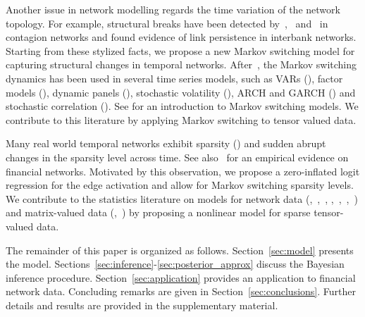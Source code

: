 \documentclass[12pt,a4paper]{article}
\theoremstyle{custom}
\begin{document}
Another issue in network modelling regards the time variation of the network topology.
For example, structural breaks have been detected by~\cite{Billioetal12GrangerNet},~\cite{Ahelegbey16BStuctVAR} and~\cite{Bianchi19GraphicalSUR} in contagion networks and \cite{Giraitis16DynamicNetwork_estimating_Financial} found evidence of link persistence in interbank networks.
Starting from these stylized facts, we propose a new Markov switching model for capturing structural changes in temporal networks.
After~\cite{Hamilton89MS}, the Markov switching dynamics has been used in several time series models, such as VARs (\cite{Sims08LargeMarkovSwitch}), factor models (\cite{Kim98MarkovSwitch_Factor}), dynamic panels (\cite{Kaufmann15MSwitch_timevarying_transitions}), stochastic volatility (\cite{Chib02MCMC_MarkovSwitch_StochVol}), ARCH and GARCH (\cite{Haas04MarkovSwitch_GARCH}) and stochastic correlation (\cite{Casarin18BayesMS_DynCorrelation}).
See \cite{Fruhwirth06FiniteMixtures_MarkovSwitch_book} for an introduction to Markov switching models. We contribute to this literature by applying Markov switching to tensor valued data.

Many real world temporal networks exhibit sparsity (\cite{Newman10Networks_book}) and sudden abrupt changes in the sparsity level across time. See also~\cite{Ahelegbey16SparseGVAR} for an empirical evidence on financial networks.
Motivated by this observation, we propose a zero-inflated logit regression for the edge activation and allow for Markov switching sparsity levels.
We contribute to the statistics literature on models for network data (\cite{DuranteDunson14LogitDynamicNetwork_GP},~\cite{WangDuranteDunson17BayesLogitNetwork},~\cite{Carvalho08Sparse_Factor_gene_network}, \cite{Chen18Bayes_Dynamic_Network},~\cite{Berry19Bayes_Count_Network},~\cite{Snijders10MLE_Network_Dynamic},~\cite{Kolar10Estimate_Temporal_Nets}) and matrix-valued data (\cite{Windle14StateSpace_matrices},~\cite{Carvalho07Dynamic_Matrix_Graphical}) by proposing a nonlinear model for sparse tensor-valued data.

The remainder of this paper is organized as follows. Section~\ref{sec:model} presents the model. Sections~\ref{sec:inference}-\ref{sec:posterior_approx} discuss the Bayesian inference procedure. Section~\ref{sec:application} provides an application to financial network data. Concluding remarks are given in Section~\ref{sec:conclusions}. Further details and results are provided in the supplementary material.
\end{document}
